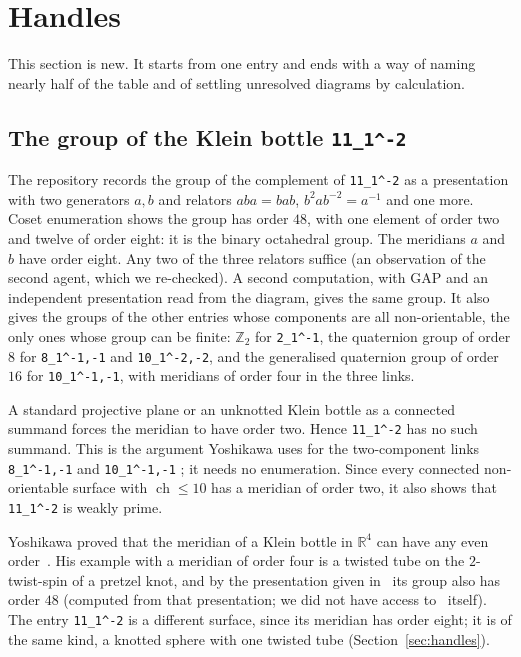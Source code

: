 \documentclass[11pt]{amsart}
\newcommand{\ch}{\operatorname{ch}}
\newcommand{\lab}[1]{\texttt{#1}}
\theoremstyle{plain}
\theoremstyle{remark}
\begin{document}
\section{Handles}\label{sec:new}

This section is new. It starts from one entry and ends with a way of naming nearly half of the table
and of settling unresolved diagrams by calculation.

\subsection{The group of the Klein bottle \texorpdfstring{\lab{11\_1\^{}-2}}{11\_1\^{}-2}}

The repository records the group of the complement of \lab{11\_1\^{}-2} as a presentation with two
generators $a,b$ and relators $aba=bab$, $b^2ab^{-2}=a^{-1}$ and one more. Coset enumeration shows the
group has order $48$, with one element of order two and twelve of order eight: it is the binary
octahedral group. The meridians $a$ and $b$ have order eight. Any two of the three relators suffice (an observation of the second agent, which we re-checked).
A second computation, with GAP and an independent presentation read from the diagram, gives the same
group. It also gives the groups of the other entries whose components are all non-orientable, the only
ones whose group can be finite: $\mathbb{Z}_2$ for \lab{2\_1\^{}-1}, the quaternion group of order $8$
for \lab{8\_1\^{}-1,-1} and \lab{10\_1\^{}-2,-2}, and the generalised quaternion group of order $16$ for
\lab{10\_1\^{}-1,-1}, with meridians of order four in the three links.

A standard projective plane or an unknotted Klein bottle as a connected summand forces the meridian to
have order two. Hence \lab{11\_1\^{}-2} has no such summand. This is the argument Yoshikawa uses for the
two-component links \lab{8\_1\^{}-1,-1} and \lab{10\_1\^{}-1,-1} \cite[Prop.~5.3]{Y}; it needs no
enumeration. Since every connected non-orientable surface with $\ch\le 10$ has a meridian of order two,
it also shows that \lab{11\_1\^{}-2} is weakly prime.

Yoshikawa proved that the meridian of a Klein bottle in $\mathbb{R}^4$ can have any even
order~\cite{Y98}. His example with a meridian of order four is a twisted tube on the $2$-twist-spin of a
pretzel knot, and by the presentation given in~\cite{M} its group also has order $48$ (computed from that
presentation; we did not have access to~\cite{Y98} itself). The entry
\lab{11\_1\^{}-2} is a different surface, since its meridian has order eight; it is of the same kind,
a knotted sphere with one twisted tube (Section~\ref{sec:handles}).
\end{document}
